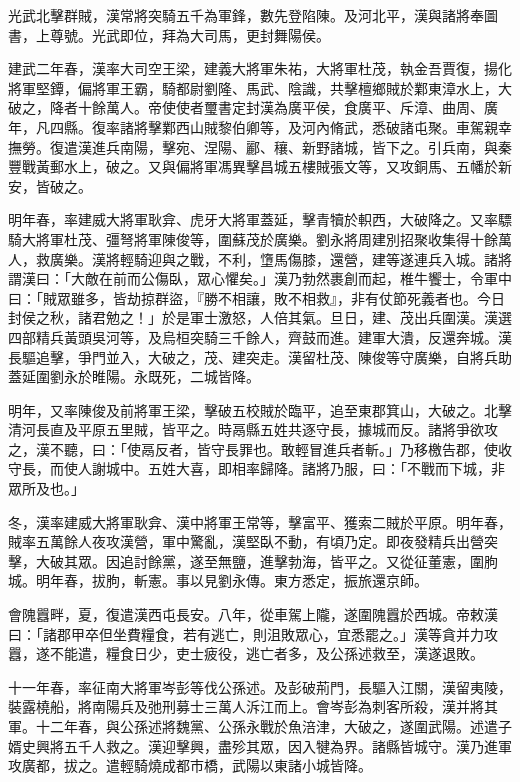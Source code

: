 \begin{pinyinscope}
光武北擊群賊，漢常將突騎五千為軍鋒，數先登陷陳。及河北平，漢與諸將奉圖書，上尊號。光武即位，拜為大司馬，更封舞陽侯。

建武二年春，漢率大司空王梁，建義大將軍朱祐，大將軍杜茂，執金吾賈復，揚化將軍堅鐔，偏將軍王霸，騎都尉劉隆、馬武、陰識，共擊檀鄉賊於鄴東漳水上，大破之，降者十餘萬人。帝使使者璽書定封漢為廣平侯，食廣平、斥漳、曲周、廣年，凡四縣。復率諸將擊鄴西山賊黎伯卿等，及河內脩武，悉破諸屯聚。車駕親幸撫勞。復遣漢進兵南陽，擊宛、涅陽、酈、穰、新野諸城，皆下之。引兵南，與秦豐戰黃郵水上，破之。又與偏將軍馮異擊昌城五樓賊張文等，又攻銅馬、五幡於新安，皆破之。

明年春，率建威大將軍耿弇、虎牙大將軍蓋延，擊青犢於軹西，大破降之。又率驃騎大將軍杜茂、彊弩將軍陳俊等，圍蘇茂於廣樂。劉永將周建別招聚收集得十餘萬人，救廣樂。漢將輕騎迎與之戰，不利，墯馬傷膝，還營，建等遂連兵入城。諸將謂漢曰：「大敵在前而公傷臥，眾心懼矣。」漢乃勃然裹創而起，椎牛饗士，令軍中曰：「賊眾雖多，皆劫掠群盜，『勝不相讓，敗不相救』，非有仗節死義者也。今日封侯之秋，諸君勉之！」於是軍士激怒，人倍其氣。旦日，建、茂出兵圍漢。漢選四部精兵黃頭吳河等，及烏桓突騎三千餘人，齊鼓而進。建軍大潰，反還奔城。漢長驅追擊，爭門並入，大破之，茂、建突走。漢留杜茂、陳俊等守廣樂，自將兵助蓋延圍劉永於睢陽。永既死，二城皆降。

明年，又率陳俊及前將軍王梁，擊破五校賊於臨平，追至東郡箕山，大破之。北擊清河長直及平原五里賊，皆平之。時鬲縣五姓共逐守長，據城而反。諸將爭欲攻之，漢不聽，曰：「使鬲反者，皆守長罪也。敢輕冒進兵者斬。」乃移檄告郡，使收守長，而使人謝城中。五姓大喜，即相率歸降。諸將乃服，曰：「不戰而下城，非眾所及也。」

冬，漢率建威大將軍耿弇、漢中將軍王常等，擊富平、獲索二賊於平原。明年春，賊率五萬餘人夜攻漢營，軍中驚亂，漢堅臥不動，有頃乃定。即夜發精兵出營突擊，大破其眾。因追討餘黨，遂至無鹽，進擊勃海，皆平之。又從征董憲，圍朐城。明年春，拔朐，斬憲。事以見劉永傳。東方悉定，振旅還京師。

會隗囂畔，夏，復遣漢西屯長安。八年，從車駕上隴，遂圍隗囂於西城。帝敕漢曰：「諸郡甲卒但坐費糧食，若有逃亡，則沮敗眾心，宜悉罷之。」漢等貪并力攻囂，遂不能遣，糧食日少，吏士疲役，逃亡者多，及公孫述救至，漢遂退敗。

十一年春，率征南大將軍岑彭等伐公孫述。及彭破荊門，長驅入江關，漢留夷陵，裝露橈船，將南陽兵及弛刑募士三萬人泝江而上。會岑彭為刺客所殺，漢并將其軍。十二年春，與公孫述將魏黨、公孫永戰於魚涪津，大破之，遂圍武陽。述遣子婿史興將五千人救之。漢迎擊興，盡殄其眾，因入犍為界。諸縣皆城守。漢乃進軍攻廣都，拔之。遣輕騎燒成都市橋，武陽以東諸小城皆降。


\end{pinyinscope}
